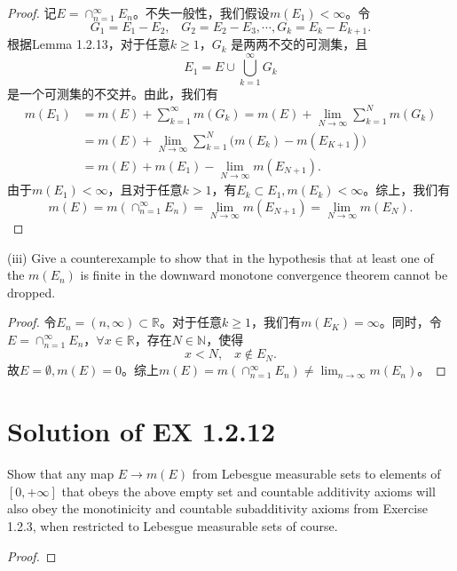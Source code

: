 \documentclass[reqno,a4paper,14pt]{amsart}
\begin{document}
\begin{proof}
    记$E=\cap_{n=1}^\infty E_n$。不失一般性，我们假设$m(E_1)<\infty$。令
    \begin{equation*}
        G_1=E_1-E_2,\;\;\; G_2=E_2-E_3, \cdots, G_k=E_k-E_{k+1}.
    \end{equation*}
    根据Lemma 1.2.13，对于任意$k\geq 1$，$G_k$ 是两两不交的可测集，且
    \begin{equation*}
        E_1=E\cup \bigcup_{k=1}^\infty G_k
    \end{equation*}
    是一个可测集的不交并。由此，我们有
    \begin{equation*}
        \begin{split}
            m(E_1)&=m(E)+\sum_{k=1}^\infty m(G_k)=m(E)+\lim_{N\to\infty} \sum_{k=1}^N m(G_k)\\
            &=m(E)+\lim_{N\to\infty}\sum_{k=1}^N\bigl(m(E_k)-m(E_{K+1})\bigr)\\
            &=m(E)+m(E_1)-\lim_{N\to\infty}m(E_{N+1}).
        \end{split}
    \end{equation*}
    由于$m(E_1)<\infty$，且对于任意$k>1$，有$E_k\subset E_1,m(E_k)<\infty$。综上，我们有
    \begin{equation*}
        m(E)=m(\cap_{n=1}^\infty E_n)=\lim_{N\to\infty}m(E_{N+1})=\lim_{N\to\infty}m(E_{N}).
    \end{equation*}
\end{proof}
(iii) Give a counterexample to show that in the hypothesis that at least one of the $m(E_n)$ is finite in the downward monotone convergence theorem cannot be dropped.
\begin{proof}
    令$E_n=(n,\infty)\subset \mathbb{R}$。对于任意$k\geq 1$，我们有$m(E_K)=\infty$。同时，令$E=\cap_{n=1}^\infty E_n$，$\forall x\in \mathbb{R}$，存在$N\in\mathbb{N}$，使得
    \begin{equation*}
        x<N,\;\;\; x\notin E_N.
    \end{equation*}
    故$E=\emptyset,m(E)=0$。综上$m(E)=m(\cap_{n=1}^\infty E_n)\neq \lim_{n\to\infty}m(E_n)$。
\end{proof}


\section{Solution of EX 1.2.12}
Show that any map $E\to m(E)$ from Lebesgue measurable sets to elements of $[0,+\infty]$ that obeys the above empty set and countable additivity axioms will also obey the monotinicity and countable subadditivity axioms from Exercise 1.2.3, when restricted to Lebesgue measurable sets of course.
\begin{proof}
    
\end{proof}
\end{document}
